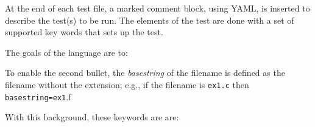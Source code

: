 At the end of each test file, a marked comment block, using YAML, is
inserted to describe the test(s) to be run.  The elements of the
test are done with a set of supported key words that sets up the test.
%
\begin{description}
\item[{The goals of the language are to:}] \leavevmode \setcounter{listcnt0}{0}

\end{description}

To enable the second bullet, the \emph{basestring} of the filename is defined
as the filename without the extension; e.g., if the filename is \lstinline{ex1.c}
then \lstinline{basestring=ex1}.f

\noindent
With this background, these keywords are are:

